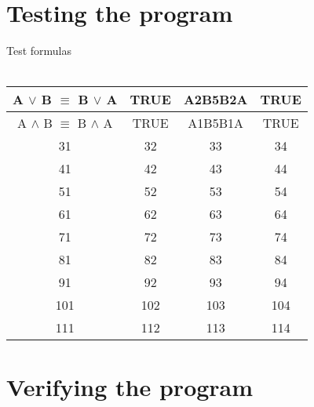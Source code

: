 \documentclass[11pt, a4paper, titlepage, block]{article}
\begin{document}
	\newpage
\section{Testing the program}
	Test formulas\\
	\\
	\begin{tabular}{|c|c|c|c|}
		\hline
			A $\vee $ B $\equiv $ B $\vee $ A & TRUE & A2B5B2A & TRUE\\
		\hline
			A $\wedge $ B $\equiv $ B $\wedge $ A & TRUE & A1B5B1A & TRUE\\
		\hline
			31 & 32 & 33 & 34\\
		\hline
			41 & 42 & 43 & 44\\
		\hline
			51 & 52 & 53 & 54\\
		\hline
			61 & 62 & 63 & 64\\
		\hline
			71 & 72 & 73 & 74\\
		\hline
			81 & 82 & 83 & 84\\
		\hline
			91 & 92 & 93 & 94\\
		\hline
			101 & 102 & 103 & 104\\
		\hline
			111 & 112 & 113 & 114\\
		\hline
	\end{tabular}

	\newpage
\section{Verifying the program}
\end{document}

